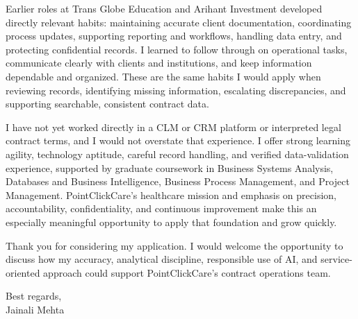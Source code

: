 \documentclass[letterpaper,11pt]{article}
\begin{document}
\bigbreak
Earlier roles at Trans Globe Education and Arihant Investment developed directly relevant habits: maintaining accurate client documentation, coordinating process updates, supporting reporting and workflows, handling data entry, and protecting confidential records. I learned to follow through on operational tasks, communicate clearly with clients and institutions, and keep information dependable and organized. These are the same habits I would apply when reviewing records, identifying missing information, escalating discrepancies, and supporting searchable, consistent contract data.

\bigbreak
I have not yet worked directly in a CLM or CRM platform or interpreted legal contract terms, and I would not overstate that experience. I offer strong learning agility, technology aptitude, careful record handling, and verified data-validation experience, supported by graduate coursework in Business Systems Analysis, Databases and Business Intelligence, Business Process Management, and Project Management. PointClickCare's healthcare mission and emphasis on precision, accountability, confidentiality, and continuous improvement make this an especially meaningful opportunity to apply that foundation and grow quickly.

\bigbreak
Thank you for considering my application. I would welcome the opportunity to discuss how my accuracy, analytical discipline, responsible use of AI, and service-oriented approach could support PointClickCare's contract operations team.

\bigbreak
Best regards,\\
Jainali Mehta
\end{document}
